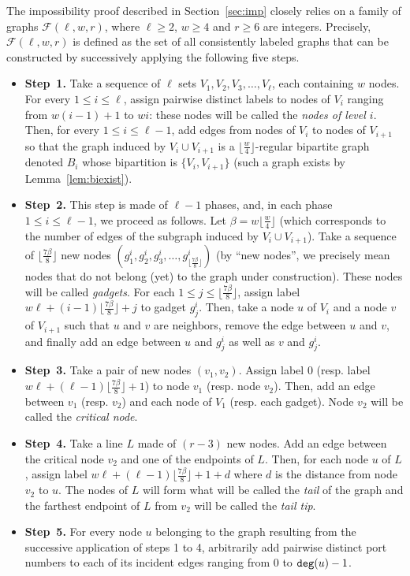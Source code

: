 \documentclass[11pt]{article}
\begin{document}
The impossibility proof described in Section~\ref{sec:imp} closely relies on a family of graphs $\mathcal{F}(\ell,w,r)$, where $\ell\geq 2$, $w\geq 4$ and $r\geq 6$ are integers. Precisely, $\mathcal{F}(\ell,w,r)$ is defined as the set of all consistently labeled graphs that can be constructed by successively applying the following five steps.

\begin{itemize}
\item{\bf Step~1.} Take a sequence of $\ell$ sets $V_1,V_2,V_3,\ldots,V_{\ell}$, each containing $w$ nodes. For every $1\leq i \leq \ell$, assign pairwise distinct labels to nodes of $V_i$ ranging from $w(i-1)+1$ to $wi$: these nodes will be called the \emph{nodes of level $i$}. Then, for every $1\leq i\leq \ell-1$, add edges from nodes of $V_i$ to nodes of $V_{i+1}$ so that the graph induced by $V_i\cup V_{i+1}$ is a $\lfloor\frac{w}{4}\rfloor$-regular bipartite graph denoted $B_i$ whose bipartition is $\{V_i,V_{i+1}\}$ (such a graph exists by Lemma~\ref{lem:biexist}).
  
\item{\bf Step~2.} This step is made of $\ell-1$ phases, and, in each phase $1\leq i \leq \ell-1$, we proceed as follows. Let $\beta=w\lfloor\frac{w}{4}\rfloor$ (which corresponds to the number of edges of the subgraph induced by $V_i\cup V_{i+1}$). Take a sequence of $\lfloor\frac{7\beta}{8}\rfloor$ new nodes $(g^i_1,g^i_2,g^i_3,\ldots,g^i_{\lfloor\frac{7\beta}{8}\rfloor})$ (by ``new nodes'', we precisely mean nodes that do not belong (yet) to the graph under construction). These nodes will be called \emph{gadgets}. For each $1\leq j \leq \lfloor\frac{7\beta}{8}\rfloor$, assign label $w\ell+ (i-1)\lfloor\frac{7\beta}{8}\rfloor+j$ to gadget $g^i_j$. Then, take a node $u$ of $V_i$ and a node $v$ of $V_{i+1}$ such that $u$ and $v$ are neighbors, remove the edge between $u$ and $v$, and finally add an edge between $u$ and $g^i_j$ as well as $v$ and $g^i_j$.
\item{\bf Step~3.} Take a pair of new nodes $(v_1,v_2)$. Assign label $0$ (resp. label $w\ell+ (\ell-1)\lfloor\frac{7\beta}{8}\rfloor+1$) to node $v_1$ (resp. node $v_2$). Then, add an edge between $v_1$ (resp. $v_2$) and each node of $V_1$ (resp. each gadget). Node $v_2$ will be called the \emph{critical node}.

\item{\bf Step~4.} Take a line $L$ made of $(r-3)$ new nodes. Add an edge between the critical node $v_2$ and one of the endpoints of $L$. Then, for each node $u$ of $L$, assign label $w\ell+ (\ell-1)\lfloor\frac{7\beta}{8}\rfloor+1+d$ where $d$ is the distance from node $v_2$ to $u$. The nodes of $L$ will form what will be called the \emph{tail} of the graph and the farthest endpoint of $L$ from $v_2$ will be called the \emph{tail tip}.
\item{\bf Step~5.} For every node $u$ belonging to the graph resulting from the successive application of steps 1 to 4, arbitrarily add pairwise distinct port numbers to each of its incident edges ranging from $0$ to ${\tt deg}(u)-1$.
\end{itemize}
\end{document}
